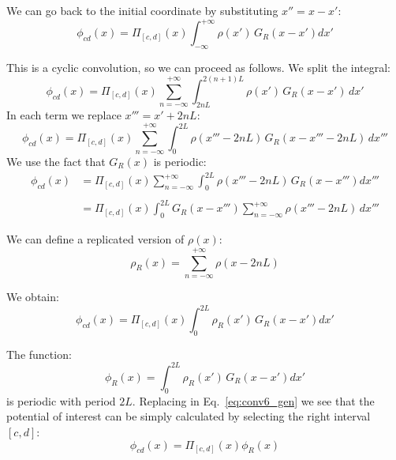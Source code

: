 We can go back to the initial coordinate by substituting $x'' = x-x'$:
\begin{equation}
\phi_{cd}(x) = 
\Pi_{[c,d]}\left({x}\right)
\int_{-\infty}^{+\infty} 
\rho(x')\,G_{R}(x-x') dx'
\end{equation}

This is a cyclic convolution, so we can proceed as follows. We split the integral:
\begin{equation}
\phi_{cd}(x) = 
\Pi_{[c,d]}\left({x}\right)
\sum_{n=-\infty}^{+\infty}
\int_{2nL}^{2(n+1)L} 
\rho(x')\,G_{R}(x-x') \,dx'
\label{eq:conv3_gen}
\end{equation}
In each term we replace $x''' = x'+2nL$:
\begin{equation}
\phi_{cd}(x) = 
\Pi_{[c,d]}\left({x}\right)
\sum_{n=-\infty}^{+\infty}
\int_{0 }^{2L} 
\rho(x'''-2nL)\,G_{R}(x-x'''-2nL) \,dx'''
\label{eq:conv4_gen}
\end{equation}
We use the fact that $G_{R}(x)$ is periodic:
\begin{equation}
\begin{split}
\phi_{cd}(x) &= 
\Pi_{[c,d]}\left({x}\right)
\sum_{n=-\infty}^{+\infty}
\int_{0 }^{2L} 
\rho(x'''-2nL)\,G_{R}(x-x''') dx'''\\
\\&=
\Pi_{[c,d]}\left({x}\right)
\int_{0 }^{2L}  
G_{R}(x-x''')
\sum_{n=-\infty}^{+\infty}
\rho(x'''-2nL) 
\, dx'''
\end{split}
\label{eq:conv5_gen}
\end{equation}

We can define a replicated version of $\rho(x)$:
\begin{equation}
\rho_{R}(x)= \sum_{n=-\infty}^{+\infty}
\rho(x-2nL)
\end{equation}


We obtain:
\begin{equation}
\phi_{cd}(x) = 
\Pi_{[c,d]}\left({x}\right)
\int_{0 }^{2L} 
\rho_{R}(x')\,G_{R}(x-x') dx'
\label{eq:conv6_gen}
\end{equation}

The function:
\begin{equation}
\phi_{R}(x) = 
\int_{0 }^{2L} 
\rho_{R}(x')\,G_{R}(x-x') dx'
\label{eq:confin_gen}
\end{equation}
is periodic with period $2L$. Replacing in Eq.~\ref{eq:conv6_gen} we see that the potential of interest can be simply calculated by selecting the right interval $[c, d]$:
\begin{equation}
\phi_{cd}(x) = 
\Pi_{[c,d]}\left({x}\right)
\phi_{R}(x)
\label{eq:sel_gen}
\end{equation}

